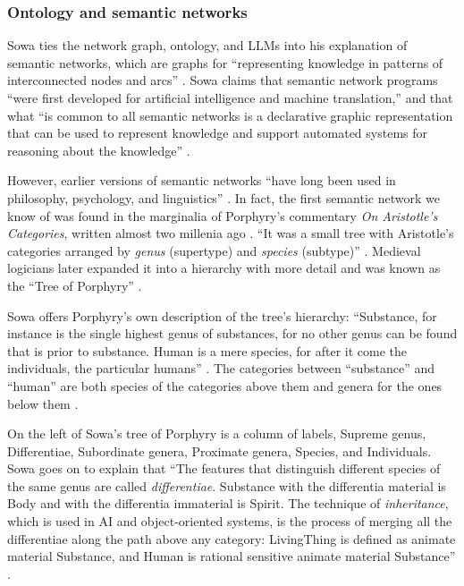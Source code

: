 \subsubsection{Ontology and semantic networks}
Sowa ties the network graph, ontology, and LLMs into his explanation of semantic networks, which are graphs for “representing knowledge in patterns of interconnected nodes and arcs” \citep{sowa_semantic_2015}. Sowa claims that semantic network programs “were first developed for artificial intelligence and machine translation,” and that what “is common to all semantic networks is a declarative graphic representation that can be used to represent knowledge and support automated systems for reasoning about the knowledge”  \citep{sowa_semantic_2015}. 

However, earlier versions of semantic networks “have long been used in philosophy, psychology, and linguistics” \citep{sowa_semantic_2015}. In fact, the first semantic network we know of was found in the marginalia of Porphyry’s commentary \textit{On Aristotle’s Categories}, written almost two millenia ago \citep[p. 4]{sowa_knowledge_2000}. “It was a small tree with Aristotle’s categories arranged by \textit{genus} (supertype) and \textit{species} (subtype)” \citep[p. 4]{sowa_knowledge_2000}. Medieval logicians later expanded it into a hierarchy with more detail and was known as the “Tree of Porphyry” \citep[p. 4]{sowa_knowledge_2000}.

Sowa offers Porphyry’s own description of the tree’s hierarchy: “Substance, for instance is the single highest genus of substances, for no other genus can be found that is prior to substance. Human is a mere species, for after it come the individuals, the particular humans” \citep[p. 5]{sowa_knowledge_2000}. The categories between “substance” and “human” are both species of the categories above them and genera for the ones below them \citep[p. 5]{sowa_knowledge_2000}.

On the left of Sowa’s tree of Porphyry is a column of labels, Supreme genus, Differentiae, Subordinate genera, Proximate genera, Species, and Individuals. Sowa goes on to explain that “The features that distinguish different species of the same genus are called \textit{differentiae}. Substance with the differentia material is Body and with the differentia immaterial is Spirit. The technique of \textit{inheritance}, which is used in AI and object-oriented systems, is the process of merging all the differentiae along the path above any category: LivingThing is defined as animate material Substance, and Human is rational sensitive animate material Substance” \citep[p. 4]{sowa_knowledge_2000}.

